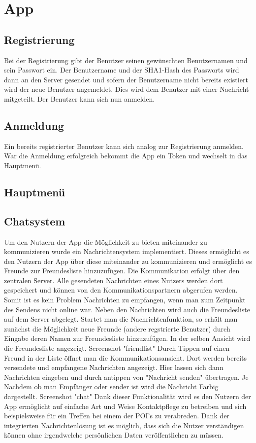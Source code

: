 \chapter{App}
\section{Registrierung}
Bei der Registrierung gibt der Benutzer seinen gewünschten Benutzernamen und sein Passwort ein. Der Benutzername und der SHA1-Hash des Passworts wird dann an den Server gesendet und sofern der Benutzername nicht bereits existiert wird der neue Benutzer angemeldet. Dies wird dem Benutzer mit einer Nachricht mitgeteilt. Der Benutzer kann sich nun anmelden.



\section{Anmeldung}
Ein bereits registrierter Benutzer kann sich analog zur Registrierung anmelden. War die Anmeldung erfolgreich bekommt die App ein Token und wechselt in das Hauptmenü.


\section{Hauptmenü}

\section{Chatsystem}
Um den Nutzern der App die Möglichkeit zu bieten miteinander zu kommunizieren wurde ein Nachrichtensystem implementiert. Dieses ermöglicht es den Nutzern der App über diese miteinander zu kommunizieren und ermöglicht es Freunde zur Freundesliste hinzuzufügen. 
Die Kommunikation erfolgt über den zentralen Server. Alle gesendeten Nachrichten eines Nutzers werden dort gespeichert und können von den Kommunikationspartnern abgerufen werden. Somit ist es kein Problem Nachrichten zu empfangen, wenn man zum Zeitpunkt des Sendens nicht online war. Neben den Nachrichten wird auch die Freundesliste auf dem Server abgelegt.
Startet man die Nachrichtenfunktion, so erhält man zunächst die Möglichkeit neue Freunde (andere regstrierte Benutzer) durch Eingabe deren Namen zur Freundesliste hinzuzufügen. In der selben Ansicht wird die Freundesliste angezeigt. 
\TODO Screenshot "friendlist"
Durch Tippen auf einen Freund in der Liste öffnet man die Kommunikationsansicht. Dort werden bereits versendete und empfangene Nachrichten angezeigt. Hier lassen sich dann Nachrichten eingeben und durch antippen von "Nachricht senden" übertragen. Je Nachdem ob man Empfänger oder sender ist wird die Nachricht Farbig dargestellt.
\TODO Screenshot "chat"
Dank dieser Funktionalität wird es den Nutzern der App ermöglicht auf einfache Art und Weise Kontaktpflege zu betreiben und sich beispielsweise für ein Treffen bei einem der POI's zu verabreden. Dank der integrierten Nachrichtenlösung ist es möglich, dass sich die Nutzer verständigen können ohne irgendwelche persönlichen Daten veröffentlichen zu müssen.

